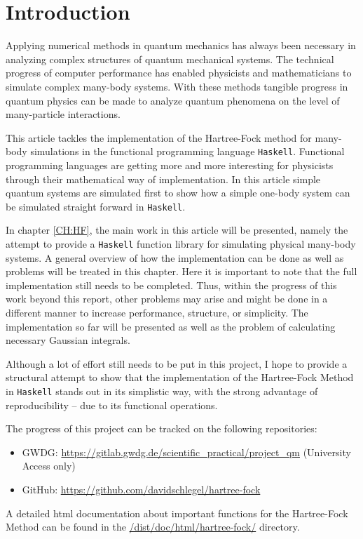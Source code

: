 \documentclass[twoside,        %
			   11pt,			%
               BCOR10mm,       %
               ngerman,english  %
               ]{scrartcl}
\begin{document}


\section{Introduction}
Applying numerical methods in quantum mechanics has always been necessary in analyzing complex structures of quantum mechanical systems. The technical progress of computer performance has enabled physicists and mathematicians to simulate complex many-body systems. With these methods tangible progress in quantum physics can be made to analyze quantum phenomena on the level of many-particle interactions. 

This article tackles the implementation of the Hartree-Fock method for many-body simulations in the functional programming language \texttt{Haskell}. Functional programming languages are getting more and more interesting for physicists through their mathematical way of implementation. In this article simple quantum systems are simulated first to show how a simple one-body system can be simulated straight forward in \texttt{Haskell}.

In chapter \ref{CH:HF}, the main work in this article will be presented, namely the attempt to provide a \texttt{Haskell} function library for simulating physical many-body systems. A general overview of how the implementation can be done as well as problems will be treated in this chapter. Here it is important to note that the full implementation still needs to be completed. Thus, within the progress of this work beyond this report, other problems may arise and might be done in a different manner to increase performance, structure, or simplicity. The implementation so far will be presented as well as the problem of calculating necessary Gaussian integrals.

Although a lot of effort still needs to be put in this project, I hope to provide a structural attempt to show that the implementation of the Hartree-Fock Method in \texttt{Haskell} stands out in its simplistic way, with the strong advantage of reproducibility -- due to its functional operations.

The progress of this project can be tracked on the following repositories:
\begin{itemize}
\item GWDG: \url{https://gitlab.gwdg.de/scientific_practical/project_qm} (University Access only)

\item GitHub: \url{https://github.com/davidschlegel/hartree-fock}
\end{itemize}
A detailed html documentation about important functions for the Hartree-Fock Method can be found in the \url{/dist/doc/html/hartree-fock/} directory.
\end{document}
